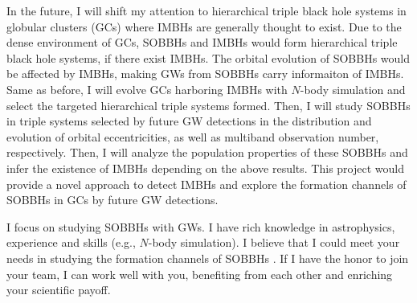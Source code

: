 \documentclass[12pt,a4paper,sans]{article}%
\begin{document}
In the future, I will shift my attention to hierarchical triple black hole systems in globular clusters (GCs) where
IMBHs are generally thought to exist. Due to the dense environment of GCs, SOBBHs and IMBHs would form hierarchical
triple black hole systems, if there exist IMBHs. The orbital evolution of SOBBHs would be affected by IMBHs, making GWs
from SOBBHs carry informaiton of IMBHs. Same as before, I will evolve GCs harboring IMBHs with $N$-body simulation and
select the targeted hierarchical triple systems formed. Then, I will study SOBBHs in triple systems selected by future GW detections in the distribution and evolution of orbital
eccentricities, as well as multiband observation number, respectively. Then, I will analyze the population properties of these SOBBHs and infer the existence of IMBHs depending on the above results. This project would provide a novel approach to detect IMBHs and explore the formation channels of SOBBHs in GCs by future GW detections.  

I focus on studying SOBBHs with GWs. I have rich knowledge in astrophysics, experience and skills (e.g., $N$-body simulation).  I believe that I could meet your needs in studying the formation channels of SOBBHs . If I have the honor to join your team, I can work well with you, benefiting from each other and enriching your scientific payoff. 




%
\end{document}
